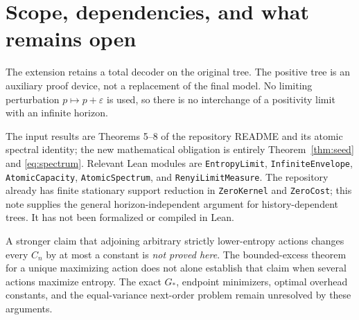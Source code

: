 \documentclass[11pt,a4paper]{article}
\begin{document}
\section{Scope, dependencies, and what remains open}
The extension retains a total decoder on the original tree. The positive
tree is an auxiliary proof device, not a replacement of the final model.
No limiting perturbation $p\mapsto p+\varepsilon$ is used, so there is no
interchange of a positivity limit with an infinite horizon.

The input results are Theorems 5--8 of the repository README and its
atomic spectral identity; the new mathematical obligation is entirely
Theorem~\ref{thm:seed} and \eqref{eq:spectrum}. Relevant Lean modules are
\texttt{EntropyLimit}, \texttt{InfiniteEnvelope}, \texttt{AtomicCapacity},
\texttt{AtomicSpectrum}, and \texttt{RenyiLimitMeasure}. The repository
already has finite stationary support reduction in \texttt{ZeroKernel}
and \texttt{ZeroCost}; this note supplies the general horizon-independent
argument for history-dependent trees. It has not been formalized or
compiled in Lean.

A stronger claim that adjoining arbitrary strictly lower-entropy actions
changes every $C_n$ by at most a constant is \emph{not proved here}.
The bounded-excess theorem for a unique maximizing action does not alone
establish that claim when several actions maximize entropy.
The exact $G_*$, endpoint minimizers, optimal overhead constants, and the
equal-variance next-order problem remain unresolved by these arguments.
\end{document}
